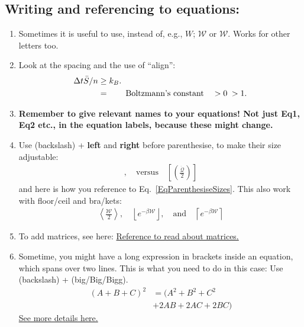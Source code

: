 \documentclass[pre,aps,reprint,noshowpacs,superscriptaddress,floatfix,letterpaper,longbibliography]{revtex4-2}
\newcommand{\Qdot}{\dot{\mathcal{Q}}}
\newcommand{\W}{\mathcal{W}}
\newcommand{\HHquad}{\hspace{0.25em}} %
\begin{document}
\subsection{Writing and referencing to equations:}  
\begin{enumerate} 

\item Sometimes it is useful to use, instead of, e.g., $W$; $\mathcal{W}$ or $\mathscr{W}$. Works for other letters too. 
    \item  Look at the spacing and the use of ``align'': 
\begin{align}
\Delta t \bar S/n&\geq k_B.\nonumber\\ 
&=\qquad\text{Boltzmann's constant}\quad >0\HHquad >1 . 
\label{EqSOvern}
\end{align}

\item \textbf{Remember to give relevant names to your equations! Not just Eq1, Eq2 etc., in the equation labels, because these might change.} 

\item Use (backslash) + \textbf{left} and \textbf{right} before parenthesise, to make their size adjustable: 
\begin{align}
[(\frac{\Qdot}{2})],\quad\text{versus}\quad \left[\left(\frac{\Qdot}{2}\right)\right] 
\label{EqParenthesiseSizes}
\end{align}
and here is how you reference to Eq.~\eqref{EqParenthesiseSizes}. 
This also work with floor/ceil and bra/kets: 
\begin{align}
\left\langle \frac{\W}{2}\right\rangle,\quad\left\lfloor e^{-\beta\W}\right\rfloor,\quad\text{and}\quad \left\lceil e^{-\beta\W}\right\rceil 
\label{EqParenthesiseSizes}
\end{align} 

\item To add matrices, see here: \href{https://www.overleaf.com/learn/latex/Matrices.}{Reference to read about matrices.} 

\item Sometime, you might have a long expression in brackets inside an equation, which spans over two lines. This is what you need to do in this case: Use (backslash) + (big/Big/Bigg). 
\begin{align}
    (A+B+C)^2&=\Big(A^2+B^2+C^2\nonumber\\ 
    &+2AB+2AC+2BC\Big)
\end{align} 
\href{https://garsia.math.yorku.ca/~zabrocki/latexpanel/latexpanel.pdf}{See more details here.}  


\end{enumerate}
\end{document}
